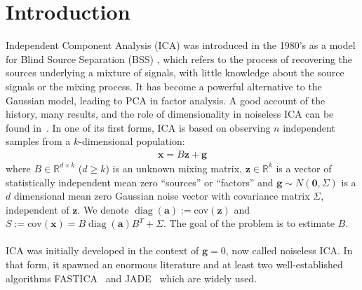 \documentclass[letterpaper]{article}
\newcommand{\ba}[1]{\begin{align}#1\end{align}}
\newcommand{\bx}{\pmb{x}}
\newcommand{\bg}{\pmb{g}}
\newcommand{\bz}{\pmb{z}}
\newcommand{\bvar}{\pmb{a}}
\newcommand{\rd}{\color{red}}
\newcommand{\bk}{\color{black}}
\newcommand{\cov}{\text{cov}}
\newcommand{\bb}[1]{\left(#1\right)}
\DeclareMathOperator{\diag}{diag}
\begin{document}
\section{Introduction}
\label{section:introduction}
Independent Component Analysis (ICA) was introduced in the 1980's as a model for Blind Source Separation (BSS)  \cite{comon2010handbook, comon1994independent}, which refers to the process of recovering the sources underlying a mixture of signals, with little knowledge about the source signals or the mixing process. It has become a powerful alternative to the Gaussian model, leading to PCA in factor analysis. A good account of the history, many results, and the role of dimensionality in noiseless ICA can be found in~\cite{hyvarinen2001independent,auddy2023large}. In one of its first forms, ICA is based on observing $n$ independent samples from a $k$-dimensional population:
\ba{ \bx = B\bz + \bg \label{eq:ICA_noise_model} }
where $B\in\mathbb{R}^{d\times k}$ ($d\geq k$) is an unknown mixing matrix, $\bz\in \mathbb{R}^{k}$ is a vector of statistically independent mean zero ``sources'' or ``factors'' and $\bg\sim N(\pmb{0},\Sigma)$ is a $d$ dimensional mean zero Gaussian noise vector with covariance matrix $\Sigma$, independent of $\bz$. We denote $\diag\bb{\bvar} := \cov\bb{\bz}$ and $S := \cov\bb{\bx} = B\diag\bb{\bvar}B^{T} + \Sigma$. The goal of the problem is to estimate $B$. 
\\ \\
ICA was initially developed in the context of $\bg=0$, now called noiseless ICA. In that form, it spawned an enormous literature  \cite{389881, 542183, 599941, 650095, cardoso1999high, hyvarinen1999fast, lee1999independent, oja2000independent, hastie2002independent, chen2005ICA,bach2003kernel,hao2009kernel} and at least two well-established algorithms FASTICA~\cite{hyvarienen1997fast} and JADE~\cite{JADE1993Cardoso} which are widely used. %
\end{document}
